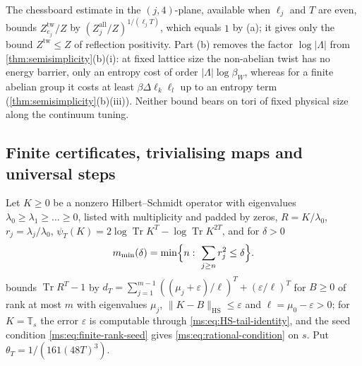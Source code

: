 \documentclass[11pt,a4paper]{amsart}
\theoremstyle{definition}
\theoremstyle{remark}
\numberwithin{equation}{section}
\DeclareMathOperator{\Tr}{Tr}        %
\newcommand{\norm}[1]{\lVert #1\rVert}     %
\newcommand{\abs}[1]{\lvert #1\rvert}      %
\newcommand{\TT}{\mathbb{T}}               %
\newcommand{\betaW}{\beta_{W}}             %
\begin{document}
The chessboard estimate \cite{frohlich1978} in the $(j,4)$-plane, available when $\ell_j$ and $T$ are even, bounds $Z^{\mathrm{tw}}_{e_j}/Z$ by $(Z^{\mathrm{all}}_j/Z)^{1/(\ell_jT)}$, which equals $1$ by (a); it gives only the bound $Z^{\mathrm{tw}}\le Z$ of reflection positivity. Part (b) removes the factor $\log\abs\Lambda$ from \cref{thm:semisimplicity}(b)(i): at fixed lattice size the non-abelian twist has no energy barrier, only an entropy cost of order $\abs{\Lambda}\log\betaW$, whereas for a finite abelian group it costs at least $\beta\Delta\ell_k\ell_l$ up to an entropy term (\cref{thm:semisimplicity}(b)(iii)). Neither bound bears on tori of fixed physical size along the continuum tuning.

\subsection{Finite certificates, trivialising maps and universal steps}

Let $K\ge0$ be a nonzero Hilbert--Schmidt operator with eigenvalues $\lambda_0\ge\lambda_1\ge\dots\ge0$, listed with multiplicity and padded by zeros, $R=K/\lambda_0$, $r_j=\lambda_j/\lambda_0$, $\psi_T(K)=2\log\Tr K^T-\log\Tr K^{2T}$, and for $\delta>0$
\[
m_{\min}(\delta)=\min\Bigl\{n:\ \sum_{j\ge n}r_j^2\le\delta\Bigr\}.
\]
 bounds $\Tr R^T-1$ by $d_T=\sum_{j=1}^{m-1}((\mu_j+\varepsilon)/\ell)^T+(\varepsilon/\ell)^T$ for $B\ge0$ of rank at most $m$ with eigenvalues $\mu_j$, $\norm{K-B}_{\mathrm{HS}}\le\varepsilon$ and $\ell=\mu_0-\varepsilon>0$; for $K=\TT_s$ the error $\varepsilon$ is computable through \eqref{ms:eq:HS-tail-identity}, and the seed condition \eqref{ms:eq:finite-rank-seed} gives \eqref{ms:eq:rational-condition} on $s$. Put $\theta_T=1/(161(48T)^3)$.
\end{document}

